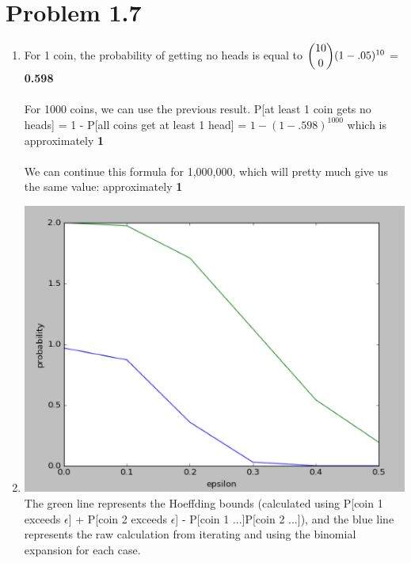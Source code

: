 \documentclass[12pt]{article}
\begin{document}
\section*{Problem 1.7}
\begin{enumerate}[label=(\alph*)]
	\item For 1 coin, the probability of getting no heads is equal to $\dbinom{10}{0}(1 - .05)^{10}$ = \textbf{0.598}
	\\ \\ For 1000 coins, we can use the previous result. P[at least 1 coin gets no heads] = 1 - P[all coins get at least 1 head] = $1 - (1 - .598)^{1000}$ which is approximately \textbf{1}
	\\ \\ We can continue this formula for 1,000,000, which will pretty much give us the same value: approximately \textbf{1}
	\item \includegraphics[scale=.5]{1-7-1.png}
	\\ The green line represents the Hoeffding bounds (calculated using P[coin 1 exceeds $\epsilon$] + P[coin 2 exceeds $\epsilon$] - P[coin 1 ...]P[coin 2 ...]), and the blue line represents the raw calculation from iterating and using the binomial expansion for each case.
\end{enumerate}
\end{document}
